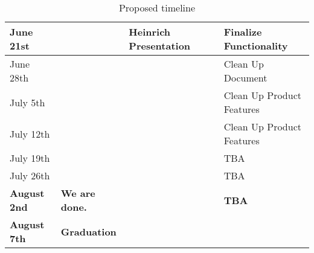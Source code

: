 \begin{table}[h!]
{\begin{tabular}{|l|l|l|l|l|}
  June 21st                     &                       & Heinrich Presentation            &                                        & Finalize Functionality                               \\ \hline
  June 28th                     &                       &                                  &                                        & Clean Up Document                                    \\ \hline
  July 5th                      &                       &                                  &                                        & Clean Up Product Features                            \\ \hline
  July 12th                     &                       &                                  &                                        & Clean Up Product Features                            \\ \hline
  July 19th                     &                       &                                  &                                        & TBA                                                  \\ \hline
  July 26th                     &                       &                                  &                                        & TBA                                                  \\ \hline
  \textbf{August 2nd}           & \textbf{We are done.} & \textbf{}                        & \textbf{}                              & \textbf{TBA}                                         \\ \hline
  \textbf{August 7th}           & \textbf{Graduation}   & \textbf{}                        & \textbf{}                              & \textbf{}                                            \\ \hline
  \end{tabular}}
  \caption{Proposed timeline}
  \label{Tab:milestones}
\end{table}

